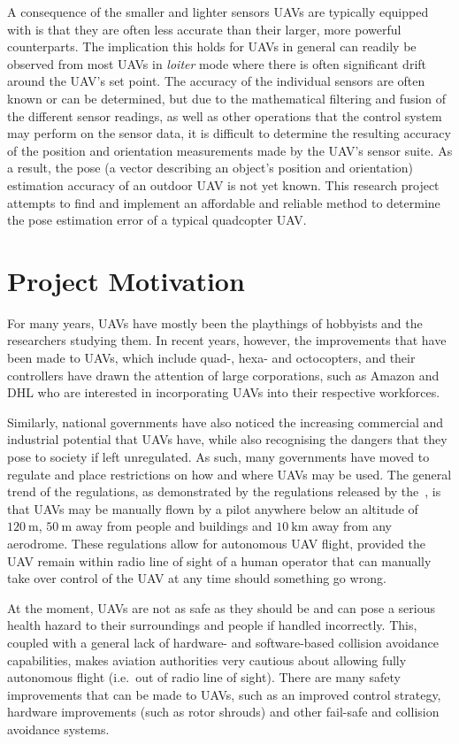 A consequence of the smaller and lighter sensors UAVs are typically e\-quipped with is that they are often less accurate than their larger, more powerful counterparts. The implication this holds for UAVs in general can readily be observed from most UAVs in \emph{loiter} mode where there is often significant drift around the UAV's set point. The accuracy of the individual sensors are often known or can be determined, but due to the mathematical filtering and fusion of the different sensor readings, as well as other operations that the control system may perform on the sensor data, it is difficult to determine the resulting accuracy of the position and orientation measurements made by the UAV's sensor suite. As a result, the pose (a vector describing an object's position and orientation) estimation accuracy of an outdoor UAV is not yet known. This research project attempts to find and implement an affordable and reliable method to determine the pose estimation error of a typical quadcopter UAV.\@  

\section{Project Motivation}

For many years, UAVs have mostly been the playthings of hobbyists and the researchers studying them. In recent years, however, the improvements that have been made to UAVs, which include quad-, hexa- and octocopters, and their controllers have drawn the attention of large corporations, such as Amazon and DHL who are interested in incorporating UAVs into their respective workforces. 

Similarly, national governments have also noticed the increasing commercial and industrial potential that UAVs have, while also recognising the dangers that they pose to society if left unregulated. As such, many governments have moved to regulate and place restrictions on how and where UAVs may be used. The general trend of the regulations, as demonstrated by the regulations released by the~\cite{sacaa-drone-regs}, is that UAVs may be manually flown by a pilot anywhere below an altitude of $\SI{120}{\m}$, $\SI{50}{\m}$ away from people and buildings and $\SI{10}{\km}$ away from any aerodrome. These regulations allow for autonomous UAV flight, provided the UAV remain within radio line of sight of a human operator that can manually take over control of the UAV at any time should something go wrong. 

At the moment, UAVs are not as safe as they should be and can pose a serious health hazard to their surroundings and people if handled incorrectly. This, coupled with a general lack of hardware- and software-based collision avoidance capabilities, makes aviation authorities very cautious about allowing fully autonomous flight (i.e.\ out of radio line of sight). There are many safety improvements that can be made to UAVs, such as an improved control strategy, hardware improvements (such as rotor shrouds) and other fail-safe and collision avoidance systems. 

